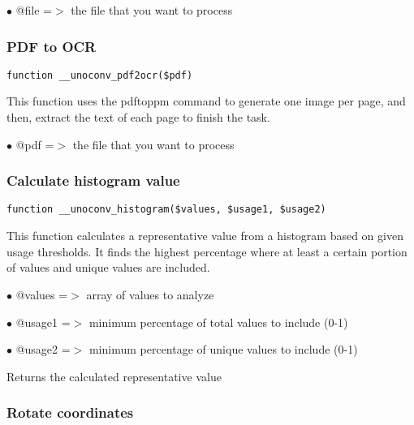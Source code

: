\documentclass[a4paper]{article}
\begin{document}
\begin{compactitem}
\item[\color{myblue}$\bullet$] @file =$>$ the file that you want to process
\end{compactitem}

\hypertarget{toc542}{}
\subsubsection{PDF to OCR}

\begin{lstlisting}
function __unoconv_pdf2ocr($pdf)
\end{lstlisting}

This function uses the pdftoppm command to generate one image per page,
and then, extract the text of each page to finish the task.

\begin{compactitem}
\item[\color{myblue}$\bullet$] @pdf =$>$ the file that you want to process
\end{compactitem}

\hypertarget{toc543}{}
\subsubsection{Calculate histogram value}

\begin{lstlisting}
function __unoconv_histogram($values, $usage1, $usage2)
\end{lstlisting}

This function calculates a representative value from a histogram based on given usage thresholds.
It finds the highest percentage where at least a certain portion of values and unique values are included.

\begin{compactitem}
\item[\color{myblue}$\bullet$] @values =$>$ array of values to analyze
\item[\color{myblue}$\bullet$] @usage1 =$>$ minimum percentage of total values to include (0-1)
\item[\color{myblue}$\bullet$] @usage2 =$>$ minimum percentage of unique values to include (0-1)
\end{compactitem}

Returns the calculated representative value

\hypertarget{toc544}{}
\subsubsection{Rotate coordinates}
\end{document}
